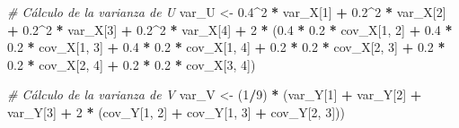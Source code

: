 \documentclass[
]{article}
\newenvironment{Shaded}{\begin{snugshade}}{\end{snugshade}}
\newcommand{\CommentTok}[1]{\textcolor[rgb]{0.56,0.35,0.01}{\textit{#1}}}
\newcommand{\DecValTok}[1]{\textcolor[rgb]{0.00,0.00,0.81}{#1}}
\newcommand{\FloatTok}[1]{\textcolor[rgb]{0.00,0.00,0.81}{#1}}
\newcommand{\NormalTok}[1]{#1}
\newcommand{\OtherTok}[1]{\textcolor[rgb]{0.56,0.35,0.01}{#1}}
\newcommand{\SpecialCharTok}[1]{\textcolor[rgb]{0.81,0.36,0.00}{\textbf{#1}}}
\begin{document}
\begin{Shaded}
\begin{Highlighting}[]
\CommentTok{\# Cálculo de la varianza de U}
\NormalTok{var\_U }\OtherTok{\textless{}{-}} \FloatTok{0.4}\SpecialCharTok{\^{}}\DecValTok{2} \SpecialCharTok{*}\NormalTok{ var\_X[}\DecValTok{1}\NormalTok{] }\SpecialCharTok{+} \FloatTok{0.2}\SpecialCharTok{\^{}}\DecValTok{2} \SpecialCharTok{*}\NormalTok{ var\_X[}\DecValTok{2}\NormalTok{] }\SpecialCharTok{+} \FloatTok{0.2}\SpecialCharTok{\^{}}\DecValTok{2} \SpecialCharTok{*}\NormalTok{ var\_X[}\DecValTok{3}\NormalTok{] }\SpecialCharTok{+} \FloatTok{0.2}\SpecialCharTok{\^{}}\DecValTok{2} \SpecialCharTok{*}\NormalTok{ var\_X[}\DecValTok{4}\NormalTok{] }\SpecialCharTok{+}
  \DecValTok{2} \SpecialCharTok{*}\NormalTok{ (}\FloatTok{0.4} \SpecialCharTok{*} \FloatTok{0.2} \SpecialCharTok{*}\NormalTok{ cov\_X[}\DecValTok{1}\NormalTok{, }\DecValTok{2}\NormalTok{] }\SpecialCharTok{+} \FloatTok{0.4} \SpecialCharTok{*} \FloatTok{0.2} \SpecialCharTok{*}\NormalTok{ cov\_X[}\DecValTok{1}\NormalTok{, }\DecValTok{3}\NormalTok{] }\SpecialCharTok{+} \FloatTok{0.4} \SpecialCharTok{*} \FloatTok{0.2} \SpecialCharTok{*}\NormalTok{ cov\_X[}\DecValTok{1}\NormalTok{, }\DecValTok{4}\NormalTok{] }\SpecialCharTok{+}
  \FloatTok{0.2} \SpecialCharTok{*} \FloatTok{0.2} \SpecialCharTok{*}\NormalTok{ cov\_X[}\DecValTok{2}\NormalTok{, }\DecValTok{3}\NormalTok{] }\SpecialCharTok{+} \FloatTok{0.2} \SpecialCharTok{*} \FloatTok{0.2} \SpecialCharTok{*}\NormalTok{ cov\_X[}\DecValTok{2}\NormalTok{, }\DecValTok{4}\NormalTok{] }\SpecialCharTok{+} \FloatTok{0.2} \SpecialCharTok{*} \FloatTok{0.2} \SpecialCharTok{*}\NormalTok{ cov\_X[}\DecValTok{3}\NormalTok{, }\DecValTok{4}\NormalTok{])}

\CommentTok{\# Cálculo de la varianza de V}
\NormalTok{var\_V }\OtherTok{\textless{}{-}}\NormalTok{ (}\DecValTok{1}\SpecialCharTok{/}\DecValTok{9}\NormalTok{) }\SpecialCharTok{*}\NormalTok{ (var\_Y[}\DecValTok{1}\NormalTok{] }\SpecialCharTok{+}\NormalTok{ var\_Y[}\DecValTok{2}\NormalTok{] }\SpecialCharTok{+}\NormalTok{ var\_Y[}\DecValTok{3}\NormalTok{] }\SpecialCharTok{+} \DecValTok{2} \SpecialCharTok{*}\NormalTok{ (cov\_Y[}\DecValTok{1}\NormalTok{, }\DecValTok{2}\NormalTok{] }\SpecialCharTok{+}\NormalTok{ cov\_Y[}\DecValTok{1}\NormalTok{, }\DecValTok{3}\NormalTok{] }\SpecialCharTok{+}\NormalTok{ cov\_Y[}\DecValTok{2}\NormalTok{, }\DecValTok{3}\NormalTok{]))}


\end{Highlighting}
\end{Shaded}
\end{document}
